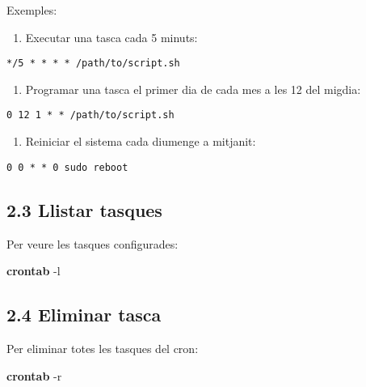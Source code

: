 \documentclass[
  12 pt,
  a4paper,
]{article}
\newenvironment{Shaded}{\begin{snugshade}}{\end{snugshade}}
\newcommand{\AttributeTok}[1]{\textcolor[rgb]{0.13,0.29,0.53}{#1}}
\newcommand{\FunctionTok}[1]{\textcolor[rgb]{0.13,0.29,0.53}{\textbf{#1}}}
\providecommand{\tightlist}{%
  \setlength{\itemsep}{0pt}\setlength{\parskip}{0pt}}
\begin{document}
Exemples:

\begin{enumerate}
\def\labelenumi{\arabic{enumi}.}
\tightlist
\item
  Executar una tasca cada 5 minuts:
\end{enumerate}

\begin{verbatim}
*/5 * * * * /path/to/script.sh
\end{verbatim}

\begin{enumerate}
\def\labelenumi{\arabic{enumi}.}
\setcounter{enumi}{1}
\tightlist
\item
  Programar una tasca el primer dia de cada mes a les 12 del migdia:
\end{enumerate}

\begin{verbatim}
0 12 1 * * /path/to/script.sh
\end{verbatim}

\begin{enumerate}
\def\labelenumi{\arabic{enumi}.}
\setcounter{enumi}{2}
\tightlist
\item
  Reiniciar el sistema cada diumenge a mitjanit:
\end{enumerate}

\begin{verbatim}
0 0 * * 0 sudo reboot
\end{verbatim}

\subsection{2.3 Llistar tasques}\label{llistar-tasques}

Per veure les tasques configurades:

\begin{Shaded}
\begin{Highlighting}[]
\FunctionTok{crontab} \AttributeTok{{-}l}
\end{Highlighting}
\end{Shaded}

\subsection{2.4 Eliminar tasca}\label{eliminar-tasca}

Per eliminar totes les tasques del cron:

\begin{Shaded}
\begin{Highlighting}[]
\FunctionTok{crontab} \AttributeTok{{-}r}
\end{Highlighting}
\end{Shaded}
\end{document}
